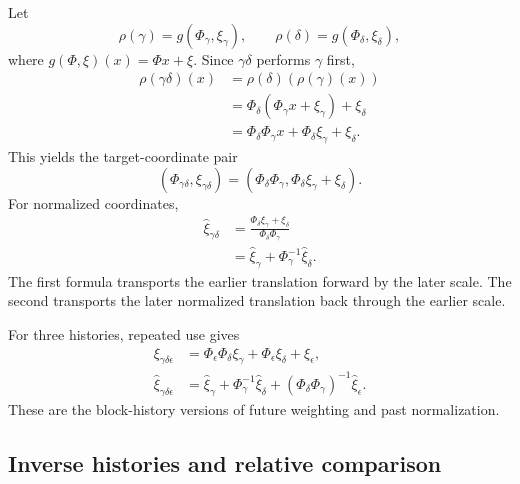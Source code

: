 Let
\[
  \rho(\gamma)=g(\Phi_\gamma,\xi_\gamma),
  \qquad
  \rho(\delta)=g(\Phi_\delta,\xi_\delta),
\]
where $g(\Phi,\xi)(x)=\Phi x+\xi$.  Since $\gamma\delta$ performs $\gamma$
first,
\begin{align*}
  \rho(\gamma\delta)(x)
  &=\rho(\delta)(\rho(\gamma)(x))\\
  &=\Phi_\delta(\Phi_\gamma x+\xi_\gamma)+\xi_\delta\\
  &=\Phi_\delta\Phi_\gamma x
    +\Phi_\delta\xi_\gamma+\xi_\delta.
\end{align*}
This yields the target-coordinate pair
\[
  (\Phi_{\gamma\delta},\xi_{\gamma\delta})
  =(\Phi_\delta\Phi_\gamma,
    \Phi_\delta\xi_\gamma+\xi_\delta).
\]
For normalized coordinates,
\begin{align*}
  \widehat\xi_{\gamma\delta}
  &=\frac{\Phi_\delta\xi_\gamma+\xi_\delta}
          {\Phi_\delta\Phi_\gamma}\\
  &=\widehat\xi_\gamma
    +\Phi_\gamma^{-1}\widehat\xi_\delta.
\end{align*}
The first formula transports the earlier translation forward by the later
scale.  The second transports the later normalized translation back through
the earlier scale.

For three histories, repeated use gives
\begin{align*}
  \xi_{\gamma\delta\epsilon}
  &=\Phi_\epsilon\Phi_\delta\xi_\gamma
    +\Phi_\epsilon\xi_\delta+\xi_\epsilon,\\
  \widehat\xi_{\gamma\delta\epsilon}
  &=\widehat\xi_\gamma
    +\Phi_\gamma^{-1}\widehat\xi_\delta
    +(\Phi_\delta\Phi_\gamma)^{-1}
      \widehat\xi_\epsilon.
\end{align*}
These are the block-history versions of future weighting and past
normalization.

\subsection{Inverse histories and relative comparison}

